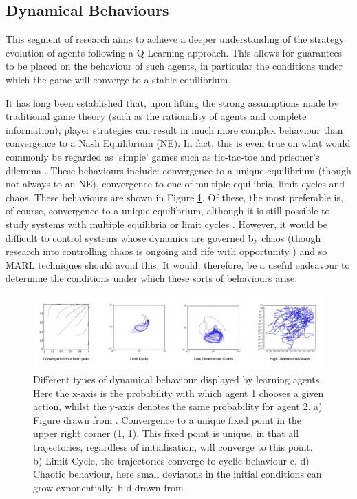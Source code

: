 \documentclass[letterpaper]{article} %
\begin{document}
\subsection{Dynamical Behaviours}

 This segment of research aims to achieve a deeper understanding
    of the strategy evolution of agents following a Q-Learning
    approach. This allows for guarantees to be placed on the behaviour
    of such agents, in particular the conditions under which the game
    will converge to a stable equilibrium.

    It has long been established that, upon lifting the strong
    assumptions made by traditional game theory (such as the
    rationality of agents and complete information), player
    strategies can result in much more complex behaviour than
    convergence to a Nash Equilibrium (NE). In fact, this is even true
    on what would commonly be regarded as 'simple' games such as
    tic-tac-toe and prisoner's dilemma \cite{Galla2011,
      Sato2002}. These behaviours include: convergence to a unique
    equilibrium (though not always to an NE), convergence to one of
    multiple equilibria, limit cycles and chaos. These behaviours are
    shown in Figure \ref{fig::DynamicalBehaviours}. Of these, the most
    preferable is, of course, convergence to a unique equilibrium,
    although it is still possible to study systems with multiple
    equilibria or limit cycles \cite{Strogatz2000}. However, it would
    be difficult to control systems whose dynamics are governed by
    chaos (though research into controlling chaos is ongoing and rife
    with opportunity \cite{Fradkov2009}) and so MARL techniques should
    avoid this. It would, therefore, be a useful endeavour to
    determine the conditions under which these sorts of behaviours
    arise.

    \begin{figure}[h]
        \centering
        \includegraphics[width=1.1\textwidth]{Figures/DynamicalBehaviours}
        \caption{ \label{fig::DynamicalBehaviours} Different types of dynamical behaviour
       displayed
        by learning agents. Here the x-axis is the probability with which agent 1 chooses a given action, whilst the y-axis denotes the same probability for agent 2. a) Figure drawn from \cite{Tuyls2006AnGames}.
        Convergence
        to a unique fixed point in the upper right corner (1, 1). This fixed point is unique, in
        that all trajectories, regardless of initialisation, will converge to this point. b) Limit Cycle, the trajectories converge to cyclic behaviour c,
        d) Chaotic behaviour, here small deviatons in the initial conditions can grow
        exponentially. b-d drawn from \cite{Sanders2018}}
    \end{figure}
\end{document}
